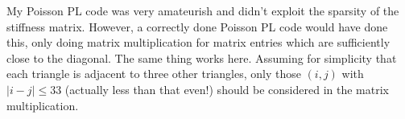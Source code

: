 \documentclass[10pt]{article}
\theoremstyle{definition}
\begin{document}
My Poisson PL code was very amateurish and didn't exploit the sparsity of the stiffness matrix.
However, a correctly done Poisson PL code would have done this, only doing matrix multiplication for matrix entries which are sufficiently close to the diagonal.
The same thing works here.
Assuming for simplicity that each triangle is adjacent to three other triangles, only those $(i, j)$ with $|i - j| \leq 33$ (actually less than that even!) should be considered in the matrix multiplication.
\end{document}
